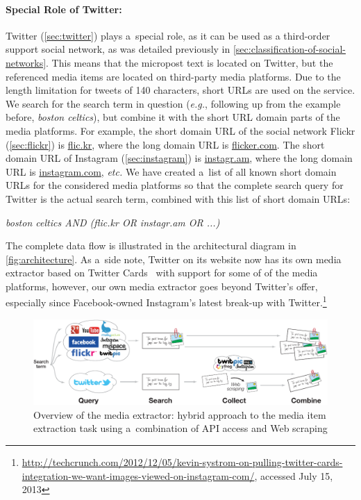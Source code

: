 \paragraph{Special Role of Twitter:}

Twitter (\autoref{sec:twitter})
plays a~special role, as it can be used as
a third-order support social network,
as was detailed previously in \autoref{sec:classification-of-social-networks}.
This means that the micropost text is located on Twitter,
but the referenced media items are located
on third-party media platforms.
Due to the length limitation for tweets of 140 characters,
short URLs are used on the service.
We search for the search term in question (\emph{e.g.},
following up from the example before, \emph{boston celtics}),
but combine it with the short URL domain parts of
the media platforms.
For example, the short domain URL of the social network Flickr
(\autoref{sec:flickr})
is \url{flic.kr}, where the long domain URL is \url{flicker.com}.
The short domain URL of Instagram
(\autoref{sec:instagram}) is \url{instagr.am},
where the long domain URL is \url{instagram.com}, \emph{etc.}
We have created a~list of all known short domain URLs for the
considered media platforms so that the complete search query
for Twitter is the actual search term,
combined with this list of short domain URLs:

\emph{boston celtics AND (flic.kr OR instagr.am OR ...)}

\noindent The complete data flow is illustrated in the
architectural diagram in \autoref{fig:architecture}.
As a~side note, Twitter on its website now has its own
media extractor based on Twitter Cards~\cite{wang2012twitter}
with support for some of of the media platforms,
however, our own media extractor goes beyond Twitter's offer,
especially since Facebook-owned Instagram's latest break-up with
Twitter.\footnote{\url{http://techcrunch.com/2012/12/05/kevin-systrom-on-pulling-twitter-cards-integration-we-want-images-viewed-on-instagram-com/}, accessed July 15, 2013}

\begin{figure}
  \centering
  \includegraphics[width=1.0\linewidth]{architecture.pdf}
  \caption[Overview of the media extractor]
    {Overview of the media extractor:
    hybrid approach to the media item extraction task using
    a~combination of API access and Web scraping}
  \label{fig:architecture}
\end{figure}

